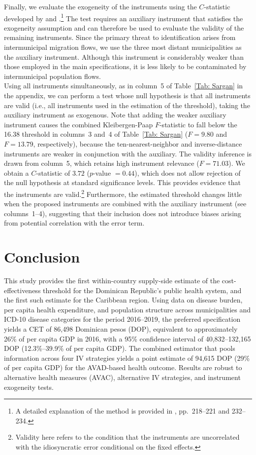 \documentclass[11pt]{article}
\numberwithin{equation}{section}
\theoremstyle{remark}
\begin{document}
Finally, we evaluate the exogeneity of the instruments using the $C$-statistic developed by \citet{K.Newey1985} and \citet{Eichenbaum1988}.\footnote{A detailed explanation of the method is provided in \citet{Hayashi2000}, pp.~218--221 and 232--234.} The test requires an auxiliary instrument that satisfies the exogeneity assumption and can therefore be used to evaluate the validity of the remaining instruments. Since the primary threat to identification arises from intermunicipal migration flows, we use the three most distant municipalities as the auxiliary instrument. Although this instrument is considerably weaker than those employed in the main specifications, it is less likely to be contaminated by intermunicipal population flows.\\

Using all instruments simultaneously, as in column~5 of Table~\ref{Tab: Sargan} in the appendix, we can perform a test whose null hypothesis is that all instruments are valid (i.e., all instruments used in the estimation of the threshold), taking the auxiliary instrument as exogenous. Note that adding the weaker auxiliary instrument causes the combined Kleibergen-Paap $F$-statistic to fall below the 16.38 threshold in columns~3 and~4 of Table~\ref{Tab: Sargan} ($F = 9.80$ and $F = 13.79$, respectively), because the ten-nearest-neighbor and inverse-distance instruments are weaker in conjunction with the auxiliary. The validity inference is drawn from column~5, which retains high instrument relevance ($F = 71.03$). We obtain a $C$-statistic of $3.72$ ($p$-value $= 0.44$), which does not allow rejection of the null hypothesis at standard significance levels. This provides evidence that the instruments are valid.\footnote{Validity here refers to the condition that the instruments are uncorrelated with the idiosyncratic error conditional on the fixed effects.} Furthermore, the estimated threshold changes little when the proposed instruments are combined with the auxiliary instrument (see columns~1--4), suggesting that their inclusion does not introduce biases arising from potential correlation with the error term. 

\section{Conclusion}

This study provides the first within-country supply-side estimate of the cost-effectiveness threshold for the Dominican Republic's public health system, and the first such estimate for the Caribbean region. Using data on disease burden, per capita health expenditure, and population structure across municipalities and ICD-10 disease categories for the period 2016--2019, the preferred specification yields a CET of 86,498 Dominican pesos (DOP), equivalent to approximately 26\% of per capita GDP in 2016, with a 95\% confidence interval of 40,832--132,165 DOP (12.3\%--39.9\% of per capita GDP). The combined estimator that pools information across four IV strategies yields a point estimate of 94,615 DOP (29\% of per capita GDP) for the AVAD-based health outcome. Results are robust to alternative health measures (AVAC), alternative IV strategies, and instrument exogeneity tests.
\end{document}

